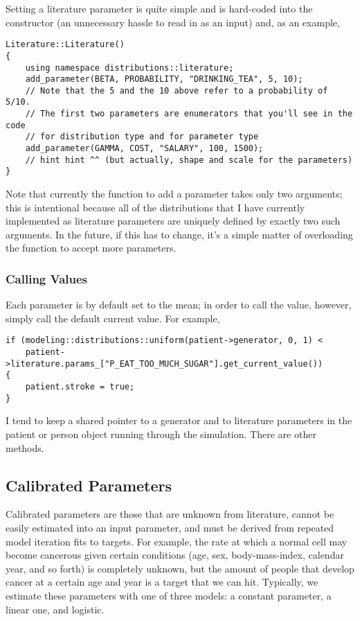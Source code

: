 \documentclass{article}
\begin{document}
Setting a literature parameter is quite simple and is hard-coded into the constructor (an unnecessary hassle to read in as an input) and, as an example,

\begin{verbatim}
Literature::Literature()
{
    using namespace distributions::literature;
    add_parameter(BETA, PROBABILITY, "DRINKING_TEA", 5, 10);
    // Note that the 5 and the 10 above refer to a probability of 5/10.
    // The first two parameters are enumerators that you'll see in the code
    // for distribution type and for parameter type 
    add_parameter(GAMMA, COST, "SALARY", 100, 1500);
    // hint hint ^^ (but actually, shape and scale for the parameters)
}
\end{verbatim}
Note that currently the function to add a parameter takes only two arguments; this is intentional because all of the distributions that I have currently implemented as literature parameters are uniquely defined by exactly two such arguments. In the future, if this has to change, it's a simple matter of overloading the function to accept more parameters. 

\subsubsection{Calling Values}

Each parameter is by default set to the mean; in order to call the value, however, simply call the default current value. For example,
\begin{verbatim}
if (modeling::distributions::uniform(patient->generator, 0, 1) <
    patient->literature.params_["P_EAT_TOO_MUCH_SUGAR"].get_current_value())
{
    patient.stroke = true;    
}
\end{verbatim}

I tend to keep a shared pointer to a generator and to literature parameters in the patient or person object running through the simulation. There are other methods.

\subsection{Calibrated Parameters}

Calibrated parameters are those that are unknown from literature, cannot be easily estimated into an input parameter, and must be derived from repeated model iteration fits to targets. For example, the rate at which a normal cell may become cancerous given certain conditions (age, sex, body-mass-index, calendar year, and so forth) is completely unknown, but the amount of people that develop cancer at a certain age and year is a target that we can hit. Typically, we estimate these parameters with one of three models: a constant parameter, a linear one, and logistic. 
\end{document}
